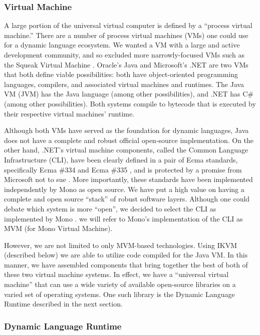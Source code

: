 \documentclass[preprint]{sigplanconf}
\begin{document}
\subsubsection{Virtual Machine}

A large portion of the universal virtual computer is defined by a
``process virtual machine.'' There are a number of process virtual
machines (VMs) one could use for a dynamic language ecosystem. We
wanted a VM with a large and active development community, and so
excluded more narrowly-focused VMs such as the Squeak Virtual Machine
\cite{squeakvm}. Oracle's Java and
Microsoft's .NET are two VMs that both define viable possibilities:
both have object-oriented programming languages, compilers, and
associated virtual machines and runtimes. The Java VM (JVM) has the
Java language (among other possibilities), and .NET has C\# (among
other possibilities). Both systems compile to bytecode that is
executed by their respective virtual machines' runtime.

Although both VMs have served as the foundation for dynamic languages,
Java does not have a complete and robust official open-source
implementation. On the other hand, .NET’s virtual machine components,
called the Common Language Infrastructure (CLI), have been clearly
defined in a pair of Ecma standards, specifically Ecma \#334 and Ecma
\#335 \cite{ecma-standards}, and is protected by a promise from
Microsoft not to sue \cite{microsoft-community-promise}. More
importantly, these standards have been implemented independently by
Mono as open source. We have put a high value on having a complete and
open source ``stack'' of robust software layers. Although one could
debate which system is more ``open'', we decided to select the CLI as
implemented by Mono \cite{mono}. we will refer to Mono's implementation of the CLI
as MVM (for Mono Virtual Machine).

However, we are not limited to only MVM-based technologies. Using IKVM
(described below) we are able to utilize code compiled for the Java
VM. In this manner, we have assembled components that bring together
the best of both of these two virtual machine systems. In effect, we
have a ``universal virtual machine'' that can use a wide variety of
available open-source libraries on a varied set of operating
systems. One such library is the Dynamic Language Runtime described in
the next section.

\subsubsection{Dynamic Language Runtime}
\end{document}
